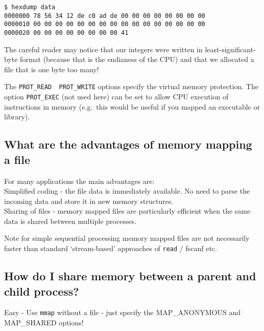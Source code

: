 \begin{verbatim}
$ hexdump data
0000000 78 56 34 12 de c0 ad de 00 00 00 00 00 00 00 00
0000010 00 00 00 00 00 00 00 00 00 00 00 00 00 00 00 00
0000020 00 00 00 00 00 00 00 00 41   
\end{verbatim}

The careful reader may notice that our integers were written in
least-significant-byte format (because that is the endianess of the CPU)
and that we allocated a file that is one byte too many!

The \texttt{PROT\_READ\ \textbar{}\ PROT\_WRITE} options specify the
virtual memory protection. The option \texttt{PROT\_EXEC} (not used
here) can be set to allow CPU execution of instructions in memory
(e.g.~this would be useful if you mapped an executable or library).

\subsection{What are the advantages of memory mapping a
file}\label{what-are-the-advantages-of-memory-mapping-a-file}

For many applications the main advantages are:\\
Simplified coding - the file data is immediately available. No need to
parse the incoming data and store it in new memory structures.\\
Sharing of files - memory mapped files are particularly efficient when
the same data is shared between multiple processes.

Note for simple sequential processing memory mapped files are not
necessarily faster than standard `stream-based' approaches of
\texttt{read} / fscanf etc.

\subsection{How do I share memory between a parent and child
process?}\label{how-do-i-share-memory-between-a-parent-and-child-process}

Easy - Use \texttt{mmap} without a file - just specify the
MAP\_ANONYMOUS and MAP\_SHARED options!

